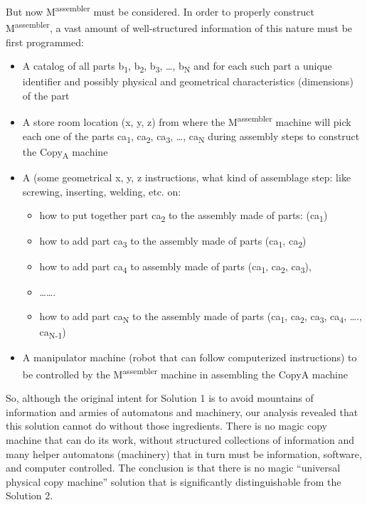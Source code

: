 But now M\textsuperscript{assembler} must be considered.  In order
to properly construct M\textsuperscript{assembler}, a vast amount
of well-structured information of this nature must be first programmed:

\begin{itemize}
\item A catalog of all parts b\textsubscript{1}, b\textsubscript{2},
b\textsubscript{3}, …, b\textsubscript{N} and for each such part a
unique identifier and possibly physical and geometrical characteristics
(dimensions) of the part
\item A store room location (x, y, z)  from where the
M\textsuperscript{assembler} machine will pick each one of the parts
ca\textsubscript{1}, ca\textsubscript{2}, ca\textsubscript{3}, …,
ca\textsubscript{N} during assembly steps to construct the
Copy\textsubscript{A} machine
\item A  (some geometrical x,
y, z instructions, what kind of assemblage step: like screwing,
inserting, welding, etc. on:

\begin{itemize}
\item how to put together part ca\textsubscript{2} to the assembly made
of parts: (ca\textsubscript{1})
\item how to add part ca\textsubscript{3} to the assembly made of parts
(ca\textsubscript{1}, ca\textsubscript{2})
\item how to add part ca\textsubscript{4} to assembly made of parts
(ca\textsubscript{1}, ca\textsubscript{2}, ca\textsubscript{3}),
\item …….
\item how to add part ca\textsubscript{N} to the assembly made of parts
(ca\textsubscript{1}, ca\textsubscript{2}, ca\textsubscript{3},
ca\textsubscript{4}, …., ca\textsubscript{N-1})
\end{itemize}
\item A manipulator machine (robot that can follow computerized
instructions) to be controlled by the M\textsuperscript{assembler}
machine in assembling the CopyA machine
\end{itemize}

So, although the original intent for Solution 1 is to avoid mountains of
information and armies of automatons and machinery, our analysis
revealed that this solution cannot do without those ingredients. 
There is no magic copy machine that can do its work, without structured
collections of information and many helper automatons (machinery) that
in turn must be information, software, and computer controlled.  
The conclusion is that there is no magic “universal physical copy machine” solution
that is significantly distinguishable from the Solution 2. 

